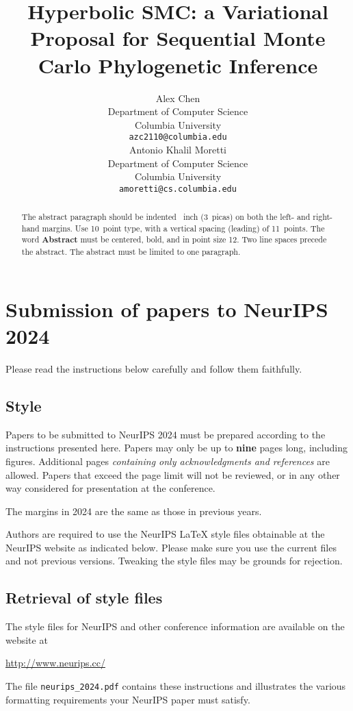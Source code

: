 \documentclass{article}
\title{Hyperbolic SMC: a Variational Proposal for Sequential Monte Carlo Phylogenetic Inference}
\author{%
  Alex Chen \\
  Department of Computer Science \\
  Columbia University \\
  \texttt{azc2110@columbia.edu} \\
  \And
  Antonio Khalil Moretti \\
  Department of Computer Science \\
  Columbia University \\
  \texttt{amoretti@cs.columbia.edu} \\
}
\begin{document}
\maketitle


\begin{abstract}
  The abstract paragraph should be indented ~inch (3~picas) on
  both the left- and right-hand margins. Use 10~point type, with a vertical
  spacing (leading) of 11~points.  The word \textbf{Abstract} must be centered,
  bold, and in point size 12. Two line spaces precede the abstract. The abstract
  must be limited to one paragraph.
\end{abstract}


\section{Submission of papers to NeurIPS 2024}


Please read the instructions below carefully and follow them faithfully.


\subsection{Style}


Papers to be submitted to NeurIPS 2024 must be prepared according to the
instructions presented here. Papers may only be up to {\bf nine} pages long,
including figures. Additional pages \emph{containing only acknowledgments and
  references} are allowed. Papers that exceed the page limit will not be
reviewed, or in any other way considered for presentation at the conference.


The margins in 2024 are the same as those in previous years.


Authors are required to use the NeurIPS \LaTeX{} style files obtainable at the
NeurIPS website as indicated below. Please make sure you use the current files
and not previous versions. Tweaking the style files may be grounds for
rejection.


\subsection{Retrieval of style files}


The style files for NeurIPS and other conference information are available on
the website at
\begin{center}
  \url{http://www.neurips.cc/}
\end{center}
The file \verb+neurips_2024.pdf+ contains these instructions and illustrates the
various formatting requirements your NeurIPS paper must satisfy.
\end{document}
